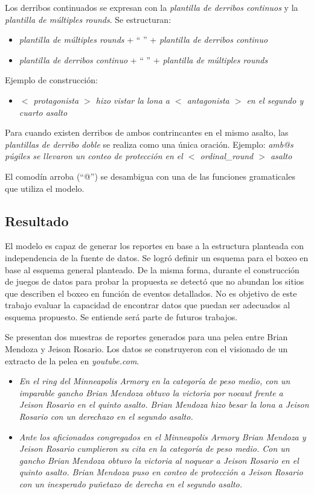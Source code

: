     Los derribos continuados se expresan con la \textit{plantilla de derribos continuos}  y la \textit{plantilla de múltiples rounds}.
    Se estructuran:
    \begin{itemize}
        \item \textit{plantilla de múltiples rounds} + “ ” + \textit{plantilla de derribos continuo}
        \item \textit{plantilla de derribos continuo} + “ ” + \textit{plantilla de múltiples rounds} 
    \end{itemize}
    Ejemplo de construcción:
    \begin{itemize}
        \item \textit{ $<$ protagonista $>$ hizo vistar la lona a $<$ antagonista $>$ en el segundo y cuarto asalto}
    \end{itemize}

    Para cuando existen derribos de ambos contrincantes en el mismo asalto, las \textit{plantillas de derribo doble} se realiza como 
una única oración.
    Ejemplo: \textit{amb@s púgiles se llevaron un conteo de protección en el $<$ ordinal\_round $>$ asalto}

    El comodín arroba (“@”) se desambigua con una de las funciones gramaticales que utiliza el modelo. 

\subsection{Resultado}

    El modelo es capaz de generar los reportes en base a la estructura planteada con independencia de la fuente de datos. 
Se logró definir un esquema para el boxeo en base al esquema general planteado. De la misma forma, durante el construcción de juegos 
de datos para probar la propuesta se detectó que no abundan los sitios que describen el boxeo en función de eventos detallados. No es 
objetivo de este trabajo evaluar la capacidad de encontrar datos que puedan ser adecuados al esquema propuesto. Se entiende será parte de 
futuros trabajos.

    Se presentan dos muestras de reportes generados para una pelea entre Brian Mendoza y Jeison Rosario. Los datos se construyeron con el 
visionado de un extracto de la pelea en \textit{youtube.com}.

    \begin{itemize}
        \item \textit{En el ring del Minneapolis Armory en la categoría de peso medio, con un imparable gancho Brian Mendoza obtuvo la victoria por nocaut frente 
        a Jeison Rosario en el quinto asalto.
        Brian Mendoza hizo besar la lona a Jeison Rosario con un derechazo en el segundo asalto.}
        \item \textit{Ante los aficionados congregados en el Minneapolis Armory Brian Mendoza y Jeison Rosario cumplieron su cita en la categoría 
        de peso medio. Con un gancho Brian Mendoza obtuvo la victoria al noquear a Jeison Rosario en el quinto asalto.
        Brian Mendoza puso en conteo de protección a Jeison Rosario con un inesperado puñetazo de derecha en el segundo asalto.}
    \end{itemize}